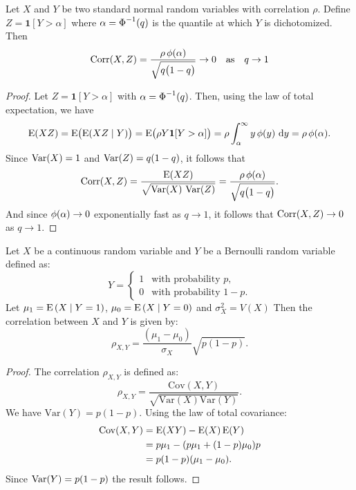 \begin{theorem}
  Let \(X\) and \(Y\) be two standard normal random variables with correlation \(\rho\).
  Define \(Z = \bm{1}[Y > \alpha]\) where \(\alpha = \operatorname{\Phi}^{-1}(q)\) is the
  quantile at which \(Y\) is dichotomized.
  Then
  \[
    \operatorname{Corr}(X,Z)
    = \frac{\rho\operatorname{\phi}(\alpha)}{\sqrt{q \bigl(1 - q\bigr)}} \rightarrow 0 \quad\text{as}\quad q \rightarrow 1
  \]
\end{theorem}
\begin{proof}
  Let \(Z = \mathbf{1}[Y > \alpha]\) with \(\alpha = \operatorname{\Phi}^{-1}(q)\). Then,
  using the law of total expectation, we have
  \[
    \operatorname{E}(XZ) = \operatorname{E}\bigl(\operatorname{E}(XZ \mid Y)\bigr) = \operatorname{E}\bigl(\rho Y \bm{1}[Y > \alpha]\bigr)
    = \rho \int_{\alpha}^{\infty} y \operatorname{\phi}(y)\,\mathop{}\!\mathrm{d} y = \rho \operatorname{\phi}(\alpha).
  \]
  Since \(\operatorname{Var}(X) = 1\) and \(\operatorname{Var}(Z) = q (1 - q)\), it follows that
  \[
    \operatorname{Corr}(X,Z) = \frac{\operatorname{E}(XZ)}{\sqrt{\operatorname{Var}(X)\,\operatorname{Var}(Z)}} = \frac{\rho \operatorname{\phi}(\alpha)}{\sqrt{q \bigl(1 - q\bigr)}}.
  \]
  And since \(\operatorname{\phi}(\alpha) \to 0\) exponentially fast as \(q \to 1\), it follows that
  \(\operatorname{Corr}(X,Z) \to 0\) as \(q \to 1\).
\end{proof}

\begin{theorem}
  Let \(X\) be a continuous random variable and \(Y\) be a Bernoulli random variable defined as:
  \[
    Y = \begin{cases}
      1 & \text{with probability } p,   \\
      0 & \text{with probability } 1-p.
    \end{cases}
  \]
  Let \(\mu_1 = \operatorname{E} \left( X \mid Y=1 \right)\), \(\mu_0 = \operatorname{E} \left( X \mid Y=0 \right)\) and
  $\sigma_X^2 = V \left(X \right)$ Then the correlation between \(X\) and \(Y\) is given by:
  \[
    \rho_{X,Y} = \frac{(\mu_1 - \mu_0)}{\sigma_X}\sqrt{p(1-p)}.
  \]
\end{theorem}

\begin{proof}
  The correlation \(\rho_{X,Y}\) is defined as:
  \[
    \rho_{X,Y} = \frac{\mathrm{Cov}(X,Y)}{\sqrt{\mathrm{Var}(X)\mathrm{Var}(Y)}}.
  \]
  We have \(\mathrm{Var}(Y)=p(1-p)\). Using the law of total covariance:
  \begin{align*}
    \mathrm{Cov}(X,Y) & = \operatorname{E} (XY) - \operatorname{E}(X) \operatorname{E}(Y)           \\
                      & = p\mu_1 - (p\mu_1 + (1-p)\mu_0)p \\
                      & = p(1-p)(\mu_1 - \mu_0).
  \end{align*}
  Since $\operatorname{Var} (Y)=p(1-p)$ the result follows.
\end{proof}

